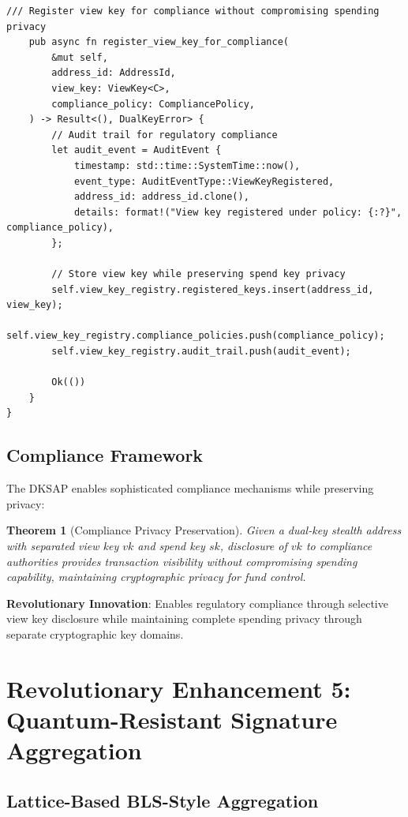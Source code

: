 \documentclass[12pt,a4paper]{article}
\newtheorem{theorem}{Theorem}[section]
\begin{document}
\begin{lstlisting}[style=rustcode, caption=Dual-Key Stealth Address Protocol]
    /// Register view key for compliance without compromising spending privacy
    pub async fn register_view_key_for_compliance(
        &mut self,
        address_id: AddressId,
        view_key: ViewKey<C>,
        compliance_policy: CompliancePolicy,
    ) -> Result<(), DualKeyError> {
        // Audit trail for regulatory compliance
        let audit_event = AuditEvent {
            timestamp: std::time::SystemTime::now(),
            event_type: AuditEventType::ViewKeyRegistered,
            address_id: address_id.clone(),
            details: format!("View key registered under policy: {:?}", compliance_policy),
        };
        
        // Store view key while preserving spend key privacy
        self.view_key_registry.registered_keys.insert(address_id, view_key);
        self.view_key_registry.compliance_policies.push(compliance_policy);
        self.view_key_registry.audit_trail.push(audit_event);
        
        Ok(())
    }
}
\end{lstlisting}

\subsection{Compliance Framework}

The DKSAP enables sophisticated compliance mechanisms while preserving privacy:

\begin{theorem}[Compliance Privacy Preservation]
Given a dual-key stealth address with separated view key $vk$ and spend key $sk$, disclosure of $vk$ to compliance authorities provides transaction visibility without compromising spending capability, maintaining cryptographic privacy for fund control.
\end{theorem}

\textbf{Revolutionary Innovation}: Enables regulatory compliance through selective view key disclosure while maintaining complete spending privacy through separate cryptographic key domains.

\section{Revolutionary Enhancement 5: Quantum-Resistant Signature Aggregation}

\subsection{Lattice-Based BLS-Style Aggregation}
\end{document}
